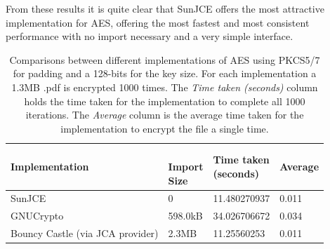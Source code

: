 \documentclass[12pt, titlepage]{article}
\begin{document}
\newline \indent From these results it is quite clear that SunJCE offers the most attractive implementation for AES, offering the most fastest and most consistent performance with no import necessary and a very simple interface.
\begin{center}
\begin{table}[H]
    \begin{tabular}{ | l | l | l | l |}
    \hline
    \textbf{Implementation} & \shortstack{\\ \textbf{Import} \\ \textbf{Size}} & \shortstack{\textbf{Time taken} \\ \textbf{(seconds)}} & \textbf{Average} \\ \hline
    
    SunJCE & 0 & 11.480270937  &  0.011 \\ \hline
    
    GNUCrypto & 598.0kB & 34.026706672  & 0.034 \\ \hline
    
    Bouncy Castle (via JCA provider) & 2.3MB & 11.25560253 & 0.011 \\ \hline
    
    \end{tabular}
    \caption{Comparisons between different implementations of AES using PKCS5/7 for padding and a 128-bits for the key size. For each implementation a 1.3MB .pdf is encrypted 1000 times. The \textit{Time taken (seconds)} column holds the time taken for the implementation to complete all 1000 iterations. The \textit{Average} column is the average time taken for the implementation to encrypt the file a single time.} \label{tab:aes.pdfComparison}
    \end{table}
\end{center}
\end{document}

